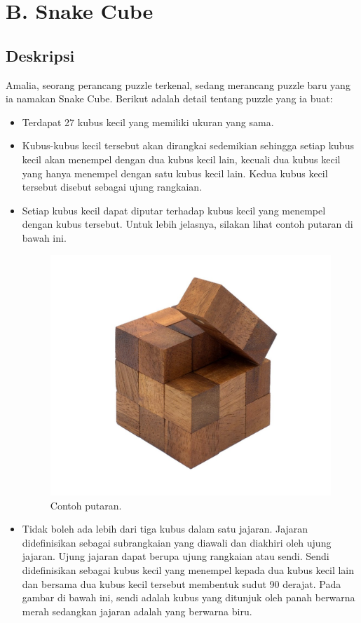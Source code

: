 \documentclass{article}
\begin{document}
\section*{\hfil B. Snake Cube\hfil}

\subsection*{Deskripsi}

\par\noindent Amalia, seorang perancang puzzle terkenal, sedang merancang puzzle baru yang ia namakan Snake Cube. Berikut adalah detail tentang puzzle yang ia buat:

\begin{itemize}
	\item Terdapat 27 kubus kecil yang memiliki ukuran yang sama.
	\item Kubus-kubus kecil tersebut akan dirangkai sedemikian sehingga setiap kubus kecil akan menempel dengan dua kubus kecil lain, kecuali dua kubus kecil yang hanya menempel dengan satu kubus kecil lain. Kedua kubus kecil tersebut disebut sebagai ujung rangkaian.
	\item Setiap kubus kecil dapat diputar terhadap kubus kecil yang menempel dengan kubus tersebut. Untuk lebih jelasnya, silakan lihat contoh putaran di bawah ini.

  \begin{figure}[h!]
    \centering
    \includegraphics[width=0.4\linewidth]{putaran.jpg}
    \caption{Contoh putaran.}
  \end{figure}


	\item Tidak boleh ada lebih dari tiga kubus dalam satu jajaran. Jajaran didefinisikan sebagai subrangkaian yang diawali dan diakhiri oleh ujung jajaran. Ujung jajaran dapat berupa ujung rangkaian atau sendi. Sendi didefinisikan sebagai kubus kecil yang menempel kepada dua kubus kecil lain dan bersama dua kubus kecil tersebut membentuk sudut 90 derajat. Pada gambar di bawah ini, sendi adalah kubus yang ditunjuk oleh panah berwarna merah sedangkan jajaran adalah yang berwarna biru.


\end{itemize}
\end{document}
